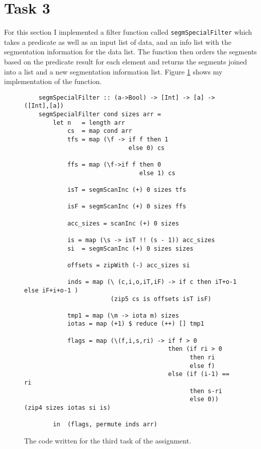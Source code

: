 \section{Task 3}

For this section I implemented a filter function called
\texttt{segmSpecialFilter} which takes a predicate as well as an input list of
data, and an info list with the segmentation information for the data list. The
function then orders the segments based on the predicate result for each element
and returns the segments joined into a list and a new segmentation information
list. Figure \ref{fig:t3code} shows my implementation of the function.

\begin{figure}[H]
    \begin{lstlisting}
    segmSpecialFilter :: (a->Bool) -> [Int] -> [a] -> ([Int],[a])
    segmSpecialFilter cond sizes arr =
        let n   = length arr
            cs  = map cond arr
            tfs = map (\f -> if f then 1
                             else 0) cs

            ffs = map (\f->if f then 0
                                else 1) cs

            isT = segmScanInc (+) 0 sizes tfs

            isF = segmScanInc (+) 0 sizes ffs

            acc_sizes = scanInc (+) 0 sizes

            is = map (\s -> isT !! (s - 1)) acc_sizes
            si  = segmScanInc (+) 0 sizes sizes

            offsets = zipWith (-) acc_sizes si

            inds = map (\ (c,i,o,iT,iF) -> if c then iT+o-1 else iF+i+o-1 )
                        (zip5 cs is offsets isT isF)

            tmp1 = map (\m -> iota m) sizes
            iotas = map (+1) $ reduce (++) [] tmp1

            flags = map (\(f,i,s,ri) -> if f > 0
                                        then (if ri > 0
                                              then ri
                                              else f)
                                        else (if (i-1) == ri
                                              then s-ri
                                              else 0)) (zip4 sizes iotas si is)

        in  (flags, permute inds arr)
    \end{lstlisting}
    \caption{The code written for the third task of the assignment.}
    \label{fig:t3code}
\end{figure}

